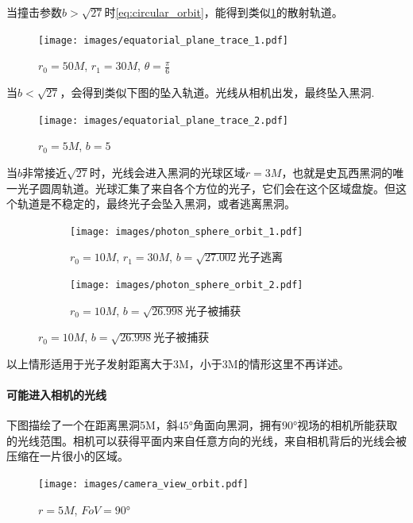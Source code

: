 当撞击参数$b>\sqrt{27}$时\eqref{eq:circular_orbit}，能得到类似\ref{fig:equatorial_plane_trace_1}的散射轨道。
\begin{figure}[htbp]
    \centering
    \texttt{[image: images/equatorial\_plane\_trace\_1.pdf]}
    \caption{$r_0=50M$, $r_1=30M$, $\theta=\frac{\pi}{6}$}\label{fig:equatorial_plane_trace_1} %
\end{figure}


当$b<\sqrt{27}$，会得到类似下图的坠入轨道。光线从相机出发，最终坠入黑洞.\begin{figure}[H]
    \centering
    \texttt{[image: images/equatorial\_plane\_trace\_2.pdf]}
    \caption{$r_0=5M$, $b=5$}\label{fig:equatorial_plane_trace_2} %
\end{figure}

当$b$非常接近$\sqrt{27}$时，光线会进入黑洞的光球区域$r=3M$，也就是史瓦西黑洞的唯一光子圆周轨道。光球汇集了来自各个方位的光子，它们会在这个区域盘旋。但这个轨道是不稳定的，最终光子会坠入黑洞，或者逃离黑洞。
\begin{figure}[htbp]
    \centering
    \begin{subfigure}{.5\textwidth}
        \centering
        \texttt{[image: images/photon\_sphere\_orbit\_1.pdf]}
        \caption{$r_0=10M$, $r_1=30M$, $b=\sqrt{27.002}$光子逃离}\label{dphi_1} %
    \end{subfigure}%
    \begin{subfigure}{.5\textwidth}
        \centering
        \texttt{[image: images/photon\_sphere\_orbit\_2.pdf]}
        \caption{$r_0=10M$, $b=\sqrt{26.998}$光子被捕获}\label{dphi_2} %
    \end{subfigure}
\end{figure}
以上情形适用于光子发射距离大于3M，小于3M的情形这里不再详述。

\paragraph{可能进入相机的光线}
下图描绘了一个在距离黑洞5M，斜$\ang{45}$角面向黑洞，拥有$\ang{90}$视场的相机所能获取的光线范围。相机可以获得平面内来自任意方向的光线，来自相机背后的光线会被压缩在一片很小的区域。
\begin{figure}[H]
    \centering
    \texttt{[image: images/camera\_view\_orbit.pdf]}
    \caption{$r=5M$, $FoV=\ang{90}$}\label{fig:camera_view_orbit} %
\end{figure}